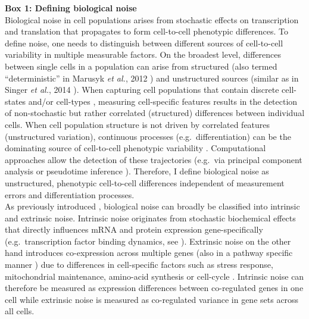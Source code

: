 \begin{Comment}
\hspace{-2.5mm}\textbf{Box 1: Defining biological noise}\\
\small
Biological noise in cell populations arises from stochastic effects on transcription and translation that propagates to form cell-to-cell phenotypic differences. To define noise, one needs to distinguish between different sources of cell-to-cell variability in multiple measurable factors. On the broadest level, differences between single cells in a population can arise from structured (also termed “deterministic” in Marusyk \emph{et al.}, 2012 \citep{Marusyk2012}) and unstructured sources (similar as in Singer \emph{et al.}, 2014 \citep{Singer2014}). When capturing cell populations that contain discrete cell-states and/or cell-types \citep{Paul2015, Ibarra-Soria2018, Rosenberg2018}, measuring cell-specific features results in the detection of non-stochastic but rather correlated (structured) differences between individual cells. When cell population structure is not driven by correlated features (unstructured variation), continuous processes (e.g.~differentiation) can be the dominating source of cell-to-cell phenotypic variability \citep{Dahlin2018}. Computational approaches allow the detection of these trajectories (e.g.~via principal component analysis or pseudotime inference \citep{Trapnell2014, Angerer2015}). Therefore, I define biological noise as unstructured, phenotypic cell-to-cell differences independent of measurement errors and differentiation processes. \\

As previously introduced \citep{Elowitz2002}, biological noise can broadly be classified into intrinsic and extrinsic noise. Intrinsic noise originates from stochastic biochemical effects that directly influences mRNA and protein expression gene-specifically (e.g.~transcription factor binding dynamics, see \citep{Swain2002}). Extrinsic noise on the other hand introduces co-expression across multiple genes (also in a pathway specific manner \citep{Raser2010}) due to differences in cell-specific factors such as stress response, mitochondrial maintenance, amino-acid synthesis \citep{Stewart-Ornstein2012} or cell-cycle \citep{Zopf2013}. Intrinsic noise can therefore be measured as expression differences between co-regulated genes in one cell while extrinsic noise is measured as co-regulated variance in gene sets across all cells.
\end{Comment}

